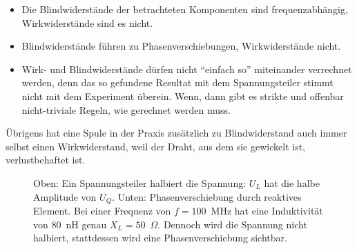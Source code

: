 \documentclass[twoside,a4paper,11pt,halfparskip,DIV=11,notitlepage]{scrartcl}
\begin{document}
\begin{itemize}
    \item Die Blindwiderstände der betrachteten Komponenten sind frequenzabhängig,
        Wirkwiderstände sind es nicht.
    \item Blindwiderstände führen zu Phasenverschiebungen, Wirkwiderstände nicht.
    \item Wirk- und Blindwiderstände dürfen nicht ``einfach so'' miteinander
        verrechnet werden, denn das so gefundene Resultat mit dem Spannungsteiler 
        stimmt nicht mit dem Experiment überein. Wenn, dann gibt es strikte und
        offenbar nicht-triviale Regeln, wie gerechnet werden muss.
\end{itemize}

Übrigens hat eine Spule in der Praxis zusätzlich zu Blindwiderstand auch immer
selbst einen Wirkwiderstand, weil der Draht, aus dem sie gewickelt ist,
verlustbehaftet ist. 


\begin{figure}
    \caption{Oben: Ein Spannungsteiler halbiert die Spannung: $U_L$ hat die
    halbe Amplitude von $U_Q$. Unten: Phasenverschiebung durch reaktives Element. Bei
einer Frequenz von $f=100$~MHz hat eine Induktivität von 80~nH genau
$X_L=50$~$\Omega$. Dennoch wird die Spannung nicht halbiert, stattdessen wird eine Phasenverschiebung sichtbar.}
    \label{fig:phasenverschiebung}
\end{figure}
\end{document}
